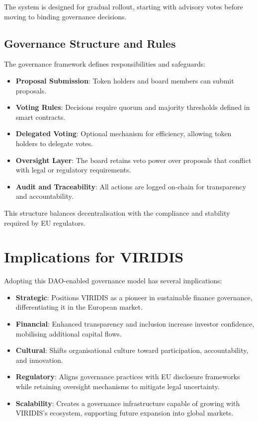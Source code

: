 \documentclass[
  english,
  12pt,
  oneside,
  open=any]{scrbook}
\providecommand{\tightlist}{%
  \setlength{\itemsep}{0pt}\setlength{\parskip}{0pt}}\usepackage{longtable,booktabs,array}
\begin{document}
The system is designed for gradual rollout, starting with advisory votes
before moving to binding governance decisions.

\subsection{Governance Structure and Rules}\label{sec-structure}

The governance framework defines responsibilities and safeguards:

\begin{itemize}
\tightlist
\item
  \textbf{Proposal Submission}: Token holders and board members can
  submit proposals.\\
\item
  \textbf{Voting Rules}: Decisions require quorum and majority
  thresholds defined in smart contracts.\\
\item
  \textbf{Delegated Voting}: Optional mechanism for efficiency, allowing
  token holders to delegate votes.\\
\item
  \textbf{Oversight Layer}: The board retains veto power over proposals
  that conflict with legal or regulatory requirements.\\
\item
  \textbf{Audit and Traceability}: All actions are logged on-chain for
  transparency and accountability.
\end{itemize}

This structure balances decentralisation with the compliance and
stability required by EU regulators.

\section{Implications for VIRIDIS}\label{sec-implications-viridis}

Adopting this DAO-enabled governance model has several implications:

\begin{itemize}
\tightlist
\item
  \textbf{Strategic}: Positions VIRIDIS as a pioneer in sustainable
  finance governance, differentiating it in the European market.\\
\item
  \textbf{Financial}: Enhanced transparency and inclusion increase
  investor confidence, mobilising additional capital flows.\\
\item
  \textbf{Cultural}: Shifts organisational culture toward participation,
  accountability, and innovation.\\
\item
  \textbf{Regulatory}: Aligns governance practices with EU disclosure
  frameworks while retaining oversight mechanisms to mitigate legal
  uncertainty.\\
\item
  \textbf{Scalability}: Creates a governance infrastructure capable of
  growing with VIRIDIS's ecosystem, supporting future expansion into
  global markets.
\end{itemize}
\end{document}
